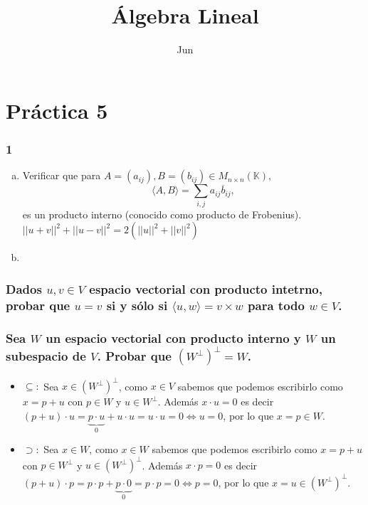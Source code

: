 \documentclass{article}
\title{Álgebra Lineal}
\date{Jun}
\begin{document}
\maketitle
\section{Práctica 5}

\subsubsection{1}
\begin{enumerate}[a.]
\item
	Verificar que para $A = (a_{ij}), B = (b_{ij}) \in M_{n \times n}(\mathbb{K}),$
	\[
		\displaystyle \langle A,B \rangle = \sum_{i,j}{a_{ij}\overline{b}_{ij}},
	\]
es un producto interno (conocido como producto de Frobenius).
	\\
	$||u+v||^2 + ||u-v||^2 = 2(||u||^2+||v||^2)$
\item
\end{enumerate}

\subsubsection{Dados $u,v \in V$ espacio vectorial con producto intetrno, probar que $u=v$ si y sólo si
$\langle u,w \rangle = v \times w $ para todo $w \in V$.}

\subsubsection{Sea $W$ un espacio vectorial con producto interno y $W$ un subespacio de $V$. Probar
que $(W^\bot)^\bot = W$.}
\begin{itemize}
\item
	$\subseteq:$ Sea $x \in (W^\bot)^\bot$, como $x \in V$ sabemos que podemos escribirlo como
	$x = p+u$ con $p \in W$ y $u \in W^\bot$. Además $x \cdot u = 0$ es decir 
	$(p+u) \cdot u = \underbrace{p \cdot u}_0 + u \cdot u = u \cdot u = 0 \Longleftrightarrow
	u = 0$, por lo que $x = p \in W$.
\item
	$\supset:$ Sea $x \in W$, como $x \in W$ sabemos que podemos escribirlo como $x = p+u$ con
	$p \in W^\bot$ y $u \in (W^\bot)^\bot$. Además $x \cdot p = 0$ es decir $(p+u) \cdot p =
	p \cdot p + \underbrace{p \cdot 0}_0 = p \cdot p = 0 \Longleftrightarrow p = 0$, por lo que
	$x = u \in (W^\bot)^\bot$.
\end{itemize}
\end{document}
